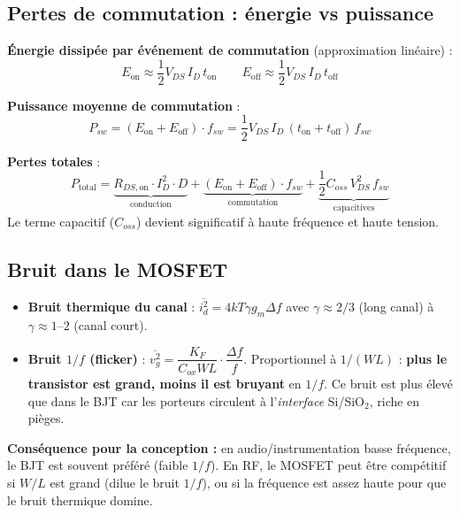 \documentclass[12pt,a4paper,twoside]{book}
\begin{document}
\subsection{Pertes de commutation : énergie vs puissance}

\begin{formule}
\textbf{Énergie dissipée par événement de commutation} (approximation linéaire) :
\[
E_{\text{on}} \approx \frac{1}{2}V_{DS}\,I_D\,t_{\text{on}} \qquad E_{\text{off}} \approx \frac{1}{2}V_{DS}\,I_D\,t_{\text{off}}
\]

\textbf{Puissance moyenne de commutation} :
\[
\boxed{P_{sw} = (E_{\text{on}} + E_{\text{off}}) \cdot f_{sw} = \frac{1}{2}V_{DS}\,I_D\,(t_{\text{on}}+t_{\text{off}})\,f_{sw}}
\]

\textbf{Pertes totales} :
\[
\boxed{P_{\text{total}} = \underbrace{R_{DS,\text{on}} \cdot I_D^2 \cdot D}_{\text{conduction}} + \underbrace{(E_{\text{on}}+E_{\text{off}})\cdot f_{sw}}_{\text{commutation}} + \underbrace{\frac{1}{2}C_{oss}\,V_{DS}^2\,f_{sw}}_{\text{capacitives}}}
\]
Le terme capacitif ($C_{oss}$) devient significatif à haute fréquence et haute tension.
\end{formule}

\subsection{Bruit dans le MOSFET}

\begin{formule}
\begin{itemize}[nosep]
\item \textbf{Bruit thermique du canal} : $\overline{i_d^2} = 4kT\gamma g_m \Delta f$ avec $\gamma \approx 2/3$ (long canal) à $\gamma \approx 1$--$2$ (canal court).
\item \textbf{Bruit $1/f$ (flicker)} : $\overline{v_g^2} = \dfrac{K_F}{C_{ox}WL}\cdot\dfrac{\Delta f}{f}$. Proportionnel à $1/(WL)$ : \textbf{plus le transistor est grand, moins il est bruyant} en $1/f$. Ce bruit est plus élevé que dans le BJT car les porteurs circulent à l'\textit{interface} Si/SiO$_2$, riche en pièges.
\end{itemize}

\textbf{Conséquence pour la conception :} en audio/instrumentation basse fréquence, le BJT est souvent préféré (faible $1/f$). En RF, le MOSFET peut être compétitif si $W/L$ est grand (dilue le bruit $1/f$), ou si la fréquence est assez haute pour que le bruit thermique domine.
\end{formule}
\end{document}
